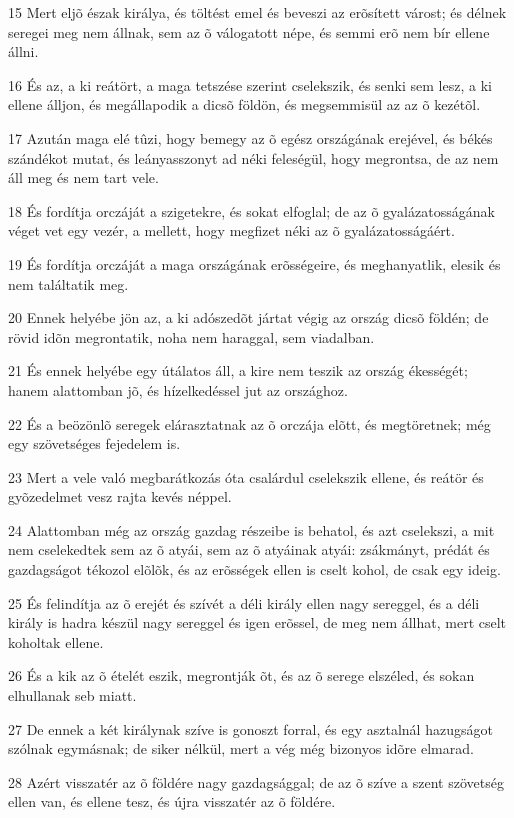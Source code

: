 \par 15 Mert eljõ észak királya, és töltést emel és beveszi az erõsített várost; és délnek seregei meg nem állnak, sem az õ válogatott népe, és semmi erõ nem bír ellene állni.
\par 16 És az, a ki reátört, a maga tetszése szerint cselekszik, és senki sem lesz, a ki ellene álljon, és megállapodik a dicsõ földön, és megsemmisül az az õ kezétõl.
\par 17 Azután maga elé tûzi, hogy bemegy az õ egész országának erejével, és békés szándékot mutat, és leányasszonyt ad néki feleségül, hogy megrontsa, de az nem áll meg és nem tart vele.
\par 18 És fordítja orczáját a szigetekre, és sokat elfoglal; de az õ gyalázatosságának véget vet egy vezér, a mellett, hogy megfizet néki az õ gyalázatosságáért.
\par 19 És fordítja orczáját a maga országának erõsségeire, és meghanyatlik, elesik és nem találtatik meg.
\par 20 Ennek helyébe jön az, a ki adószedõt jártat végig az ország dicsõ földén; de rövid idõn megrontatik, noha nem haraggal, sem viadalban.
\par 21 És ennek helyébe egy útálatos áll, a kire nem teszik az ország ékességét; hanem alattomban jõ, és hízelkedéssel jut az országhoz.
\par 22 És a beözönlõ seregek elárasztatnak az õ orczája elõtt, és megtöretnek; még egy szövetséges fejedelem is.
\par 23 Mert a vele való megbarátkozás óta csalárdul cselekszik ellene, és reátör és gyõzedelmet vesz rajta kevés néppel.
\par 24 Alattomban még az ország gazdag részeibe is behatol, és azt cselekszi, a mit nem cselekedtek sem az õ atyái, sem az õ atyáinak atyái: zsákmányt, prédát és gazdagságot tékozol elõlõk, és az erõsségek ellen is cselt kohol, de csak egy ideig.
\par 25 És felindítja az õ erejét és szívét a déli király ellen nagy sereggel, és a déli király is hadra készül nagy sereggel és igen erõssel, de meg nem állhat, mert cselt koholtak ellene.
\par 26 És a kik az õ ételét eszik, megrontják õt, és az õ serege elszéled, és sokan elhullanak seb miatt.
\par 27 De ennek a két királynak szíve is gonoszt forral, és egy asztalnál hazugságot szólnak egymásnak; de siker nélkül, mert a vég még bizonyos idõre elmarad.
\par 28 Azért visszatér az õ földére nagy gazdagsággal; de az õ szíve a szent szövetség ellen van, és ellene tesz, és újra visszatér az õ földére.
